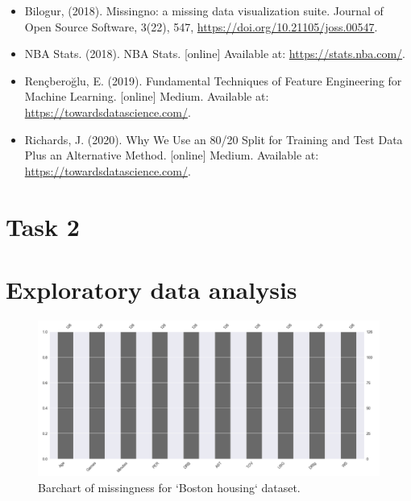 \documentclass[letterpaper,12pt,twoside,]{pinp}
\begin{document}
\begin{itemize}
\item
  Bilogur, (2018). Missingno: a missing data visualization suite.
  Journal of Open Source Software, 3(22), 547,
  \url{https://doi.org/10.21105/joss.00547}.
\item
  NBA Stats. (2018). NBA Stats. {[}online{]} Available at:
  \url{https://stats.nba.com/}.
\item
  Rençberoğlu, E. (2019). Fundamental Techniques of Feature Engineering
  for Machine Learning. {[}online{]} Medium. Available at:
  \url{https://towardsdatascience.com/}.
\item
  Richards, J. (2020). Why We Use an 80/20 Split for Training and Test
  Data Plus an Alternative Method. {[}online{]} Medium. Available at:
  \url{https://towardsdatascience.com/}.
\end{itemize}

\hypertarget{task-2}{%
\section{Task 2}\label{task-2}}

\hypertarget{exploratory-data-analysis}{%
\section{Exploratory data analysis}\label{exploratory-data-analysis}}

\begin{figure}
\includegraphics[width=1\linewidth]{miss_house.png}
\centering
\caption{Barchart of missingness for `Boston housing` dataset.}
\label{fig:knn}
\end{figure}





\end{document}
